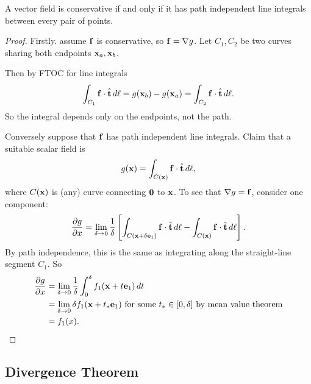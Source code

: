 \documentclass[10pt, a4paper]{article}
\begin{document}
\begin{proposition}\label{prep:mathmethII:prop:pathindep}
    A vector field is conservative if and only if it has path independent line integrals between every pair of points.

    \begin{proof}
        Firstly.
        assume $\mbf{f}$ is conservative,
        so $\mbf{f} = \bnabla g$.
        Let $C_1, C_2$ be two curves sharing both endpoints $\mbf{x}_a, \mbf{x}_b$.

        Then by FTOC for line integrals
        \[
        \int_{C_1}\mbf{f}\cdot\hat{\mbf{t}}\,d\ell = g(\mbf{x}_b) - g(\mbf{x}_a) = \int_{C_2}\mbf{f}\cdot\hat{\mbf{t}}\,d\ell.
        \]
        So the integral depends only on the endpoints,
        not the path.
        
        Conversely suppose that $\mbf{f}$ has path independent line integrals.
        Claim that a suitable scalar field is
        \[
        g(\mbf{x}) = \int_{C(\mbf{x})}\mbf{f}\cdot\hat{\mbf{t}}\,d\ell,
        \]
        where $C(\mbf{x})$ is
        (any)
        curve connecting $\mbf{0}$ to $\mbf{x}$.
        To see that $\bnabla g = \mbf{f}$,
        consider one component:
        \[
        \pd[g]{x} = \lim_{\delta \to 0}\frac{1}{\delta}\left[\int_{C(\mbf{x} + \delta \mbf{e}_1)}\mbf{f}\cdot\hat{\mbf{t}}\,d\ell - \int_{C(\mbf{x})}\mbf{f}\cdot\hat{\mbf{t}}\,d\ell\right].
        \]
        By path independence,
        this is the same as integrating along the straight-line segment $C_1$.
        So
        \begin{align*}
            \pd[g]{x} &= \lim_{\delta \to 0}\frac{1}{\delta}\int_{0}^{\delta}f_1(\mbf{x} + t\mbf{e}_1)\,dt \\
            &= \lim_{\delta \to 0}\delta f_1(\mbf{x} + t_{*}\mbf{e}_1)\text{ for some $t_{*} \in [0, \delta]$ by mean value theorem} \\
            &= f_1(x).
        \end{align*}
    \end{proof}
\end{proposition}

\subsection{Divergence Theorem}
\end{document}
